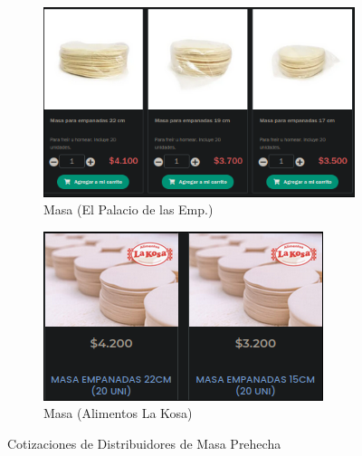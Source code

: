 \documentclass[12pt]{article}
\begin{document}
        \begin{figure}[h!] %
            \centering %
            \begin{subfigure}{0.45\textwidth}
                \centering
                \includegraphics[width=0.9\linewidth]{palaci} %
                \caption{Masa (El Palacio de las Emp.)}
                \label{fig:palacio}
            \end{subfigure}
            \hfill %
            \begin{subfigure}{0.45\textwidth}
                \centering
                \includegraphics[width=0.9\linewidth]{kosa} %
                \caption{Masa (Alimentos La Kosa)}
                \label{fig:kosa}
            \end{subfigure}
            \caption{Cotizaciones de Distribuidores de Masa Prehecha}
            \label{fig:cotizaciones_masas}
        \end{figure} %
\end{document}
